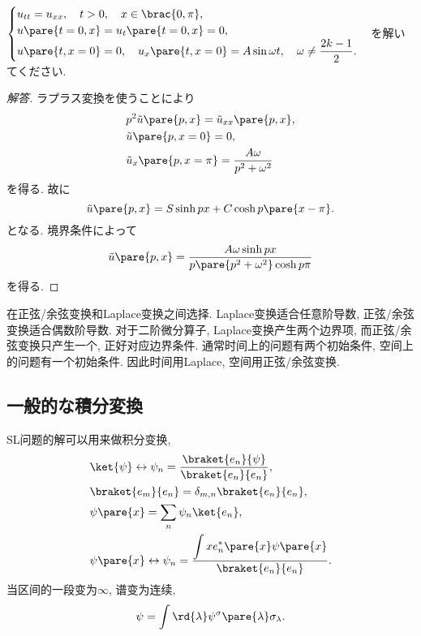 \documentclass[hidelinks]{ctexart}
\newenvironment{kaitou}{\begin{proof}[解答]}{\end{proof}}
\begin{document}
\begin{sample}
    \begin{ex}
        $\displaystyle \begin{cases}
            u_{tt} = u_{xx},\quad t>0, \quad x\in \brac{0,\pi}, \\
            u\pare{t=0,x} = u_t\pare{t=0,x} = 0, \\
            \displaystyle u\pare{t,x=0} = 0,\quad u_x\pare{t,x=0} = A \sin \omega t,\quad \omega \neq \frac{2k-1}{2}.
        \end{cases}$を解いてください.
    \end{ex}
    \begin{kaitou}
        ラプラス変換を使うことにより　%
        \begin{align*}
            & p^2 \tilde{u}\pare{p,x} = \tilde{u}_{xx}\pare{p,x}, \\
            & \tilde{u}\pare{p,x=0} = 0, \\
            & \tilde{u}_x\pare{p,x=\pi} = \frac{A\omega}{p^2+\omega^2}
        \end{align*}
        を得る. 故に
        \[ \tilde{u}\pare{p,x} = S \sinh px + C\cosh p\pare{x-\pi}. \]
        となる. 境界条件によって
        \[ \tilde{u}\pare{p,x} = \frac{A\omega \sinh px}{p\pare{p^2 + \omega^2}\cosh p\pi} \]
        を得る.
    \end{kaitou}
\end{sample}

\begin{remark}
    在正弦/余弦变换和Laplace变换之间选择. Laplace变换适合任意阶导数, 正弦/余弦变换适合偶数阶导数. 对于二阶微分算子, Laplace变换产生两个边界项, 而正弦/余弦变换只产生一个, 正好对应边界条件. 通常时间上的问题有两个初始条件, 空间上的问题有一个初始条件. 因此时间用Laplace, 空间用正弦/余弦变换.
\end{remark}



\subsection{一般的な積分変換} %
\label{sub:一般的な積分変換}

\newpoint{}SL问题的解可以用来做积分变换,
\begin{align*}
    & \ket{\psi} \leftrightarrow \psi_n = \frac{\braket{e_n}{\psi}}{\braket{e_n}{e_n}}, \\
    & \braket{e_m}{e_n} = \delta_{m,n}\braket{e_n}{e_n}, \\
    & \psi\pare{x} = \sum_n \psi_n \ket{e_n}, \\
    & \psi\pare{x} \leftrightarrow \psi_n = \frac{\displaystyle \int x e_n^*\pare{x}\psi\pare{x}}{\braket{e_n}{e_n}}.
\end{align*}
当区间的一段变为$\infty$, 谱变为连续,
\[ \psi = \int \rd{\lambda} \psi^\sigma\pare{\lambda}\sigma_\lambda. \]
\end{document}
